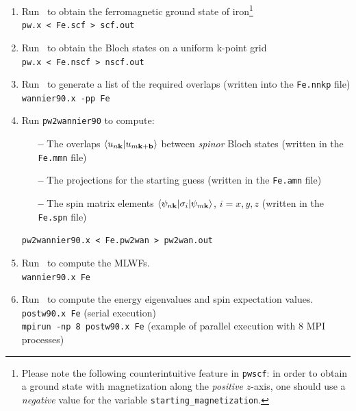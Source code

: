 \documentclass[a4paper,11pt,twoside]{article}
\begin{document}
\begin{enumerate}
\item Run \pwscf\ to obtain the ferromagnetic ground state of
  iron\footnote{Please note the following counterintuitive feature in
    {\tt pwscf}: in order to obtain a ground state with magnetization
    along the {\it positive} $z$-axis, one should use a {\it negative}
    value for the variable {\tt starting\_magnetization}.}\\
  {\tt pw.x < Fe.scf > scf.out}

\item Run \pwscf\ to obtain the Bloch states on a uniform k-point
  grid\\ 
{\tt pw.x < Fe.nscf > nscf.out}

\item Run \wannier\ to generate a list of the required overlaps (written
  into the {\tt Fe.nnkp} file)\\
{\tt wannier90.x -pp Fe}

\item Run {\tt pw2wannier90} to compute:
  \begin{itemize}

  \item[{\bf --}] The overlaps $\langle u_{n{\bf k}}\vert u_{m{\bf
        k}+{\bf b}}\rangle$ between {\it spinor} Bloch states (written
    in the {\tt Fe.mmn} file)

  \item[{\bf --}] The projections for the starting guess (written in
    the {\tt Fe.amn} file)

  \item[{\bf --}] The spin matrix elements $\langle \psi_{n{\bf
        k}}\vert \sigma_i\vert \psi_{m{\bf k}}\rangle$, $i=x,y,z$
    (written in the {\tt Fe.spn} file)
  \end{itemize}
{\tt pw2wannier90.x < Fe.pw2wan > pw2wan.out}

\item Run \wannier\ to compute the MLWFs.\\
{\tt wannier90.x Fe}

\item Run \postw\ to compute the energy eigenvalues and spin
  expectation values.\\
  {\tt postw90.x Fe} (serial execution) \\
  {\tt mpirun -np 8 postw90.x Fe} (example of parallel execution with
  8 MPI processes) 

\end{enumerate}
\end{document}
